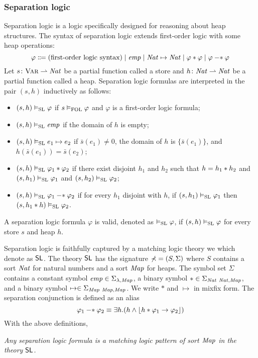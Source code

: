 \documentclass{amsart}
\begin{document}
\subsubsection{Separation logic}
\label{sec_separation_logic}

Separation logic is a logic specifically designed for reasoning about
heap structures.
The syntax of separation logic extends first-order logic with
some heap operations:
\begin{equation*}
\varphi \Coloneqq
\text{(first-order logic syntax)}
\mid \emp \mid \Nat \mapsto \Nat \mid \varphi \merge \varphi
\mid \varphi \simp \varphi
\end{equation*}
Let $s \colon \Var \pto \Nat$ be a partial function called a store
and $h \colon \Nat \pto \Nat$ be a partial function called a heap.
Separation logic formulas are interpreted in the pair $(s,h)$
inductively as follows:
\begin{itemize}
\item $(s,h) \vDash_{\SL} \varphi$
if $s \vDash_{\FOL} \varphi$ and $\varphi$ is a first-order logic formula;\item $(s,h) \vDash_\SL \emp$ if the domain of $h$ is empty;
\item $(s,h) \vDash_\SL e_1 \mapsto e_2$
      if $\bar{s}(e_1) \neq 0$, the domain of $h$ is $\{ \bar{s}(e_1) \}$, and 
      $h( \bar{s}(e_1) ) = \bar{s}(e_2)$;
\item $(s,h) \vDash_\SL \varphi_1 \merge \varphi_2$ if
      there exist disjoint $h_1$ and $h_2$ such that
      $h = h_1 \merge h_2$ and
      $(s,h_1) \vDash_\SL \varphi_1$
      and $(s, h_2) \vDash_\SL \varphi_2$;
\item $(s,h) \vDash_\SL \varphi_1 \simp \varphi_2$ if
      for every $h_1$ disjoint with $h$,
      if $(s,h_1) \vDash_\SL \varphi_1$ then
      $(s,h_1 \merge h) \vDash_\SL \varphi_2$.
\end{itemize}
A separation logic formula $\varphi$ is valid,
denoted as $\vDash_\SL \varphi$,
if $(s,h)\vDash_\SL \varphi$ for every store $s$ and heap $h$.

Separation logic is faithfully captured by a matching logic theory
we which denote as $\MLSL$.
The theory $\MLSL$ has the signature
$\sig = (S, \Sigma)$ 
where $S$ contains a sort $\Nat$ for natural numbers and
a sort $\Map$ for heaps. 
The symbol set $\Sigma$ contains
a constant symbol $\emp \in \Sigma_{\lambda,\Map}$,
a binary symbol $* \in \Sigma_{\Nat\ \Nat,\Map}$,
and a binary symbol $\mapsto \in \Sigma_{\Map\ \Map,\Map}$.
We write $*$ and $\mapsto$ in mixfix form.
The separation conjunction is defined as an alias
\begin{equation*}
\varphi_1 \simp \varphi_2 \equiv
\exists h . ( h \wedge \floor{ h \merge \varphi_1 \imp \varphi_2 } )
\end{equation*}
With the above definitions,
\begin{center}
\em Any separation logic formula is a matching logic pattern of sort $\Map$
in the theory $\MLSL$.
\end{center}
\end{document}
